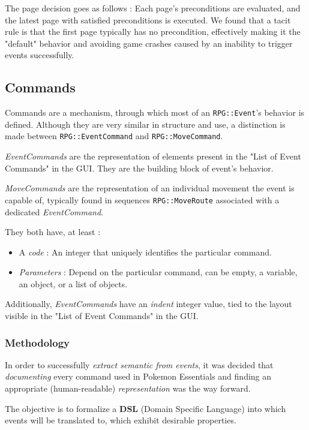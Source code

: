 \documentclass[11pt]{article}
\begin{document}
{The page decision goes as follows : Each page's preconditions are evaluated, and the latest page with satisfied preconditions is executed. We found that a tacit rule is that the first page typically has no precondition, effectively making it the "default" behavior and avoiding game crashes caused by an inability to trigger events successfully.



\subsection{Commands}

Commands are a mechanism, through which most of an \verb|RPG::Event|'s behavior is defined. Although they are very similar in structure and use, a distinction is made between \verb|RPG::EventCommand| and \verb|RPG::MoveCommand|.

\textit{EventCommands} are the representation of elements present in the "List of Event Commands" in the GUI. They are the building block of event's behavior.

\textit{MoveCommands} are the representation of an individual movement the event is capable of, typically found in sequences \verb|RPG::MoveRoute| associated with a dedicated \textit{EventCommand}.

They both have, at least :
\begin{itemize}
	\item A \textit{code} : An integer that uniquely identifies the particular command.
	\item \textit{Parameters} : Depend on the particular command, can be empty, a variable, an object, or a list of objects.
\end{itemize}

Additionally, \textit{EventCommands} have an \textit{indent} integer value, tied to the layout visible in the "List of Event Commands" in the GUI.




\subsubsection{Methodology}

In order to successfully \textit{extract semantic from events}, it was decided that \textit{documenting} every command used in Pokemon Essentials and finding an appropriate (human-readable) \textit{representation} was the way forward.

The objective is to formalize a \textbf{DSL} (Domain Specific Language) into which events will be translated to, which exhibit desirable properties.


}
\end{document}
